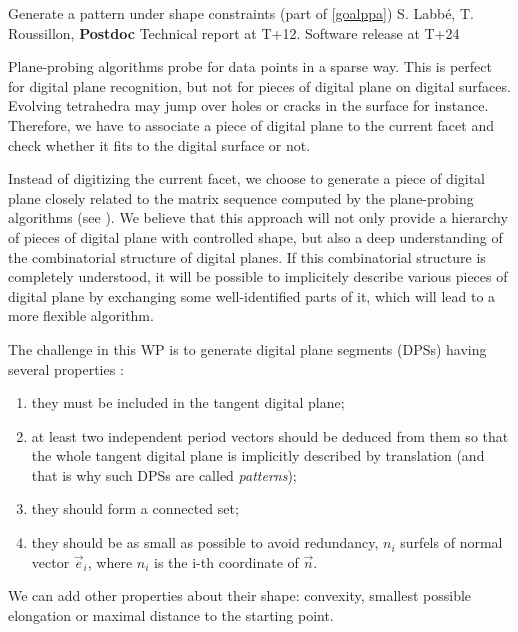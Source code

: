   

\medskip
{}
   {Generate a pattern under shape constraints (part of \ref{goalppa})}
   {S. Labb\'{e}, T. Roussillon, \textbf{Postdoc}}
   {Technical report at T+12. Software release at T+24}
\medskip

Plane-probing algorithms probe for data points in a sparse way.
This is perfect for digital plane recognition, but not for pieces
of digital plane on digital surfaces. Evolving tetrahedra may jump
over holes or cracks in the surface for instance. Therefore,
we have to associate a piece of digital plane
to the current facet and check whether it fits to the digital surface
or not.

Instead of digitizing the current facet, we choose to generate a piece
of digital plane closely related to the matrix sequence computed by
the plane-probing algorithms (see ). We believe that
this approach will not only provide a hierarchy of pieces of digital
plane with controlled shape, but also a deep understanding of the
combinatorial structure of digital planes. If this combinatorial
structure is completely understood, it will be possible to implicitely
describe various pieces of digital plane by exchanging some well-identified
parts of it, which will lead to a more flexible algorithm. 

The challenge in this WP is to generate digital plane segments (DPSs)
having several properties \cite{Jamet2016}:
\begin{enumerate}[label=(P\arabic*)]
\item they must be included in the tangent digital plane; \label{prop:inside}
\item at least two independent period vectors should be deduced from them
  so that the whole tangent digital plane is implicitly described by translation
  (and that is why such DPSs are called \emph{patterns}); \label{prop:period}
\item they should form a connected set; \label{prop:connect}
\item they should be as small as possible to avoid redundancy,
  \eg $n_i$ surfels of normal vector $\vec{e}_i$, where $n_i$ is the i-th coordinate
  of $\vec{n}$. \label{prop:small}
\end{enumerate}
We can add other properties about their shape: 
convexity, smallest possible elongation or maximal distance to the starting point.

